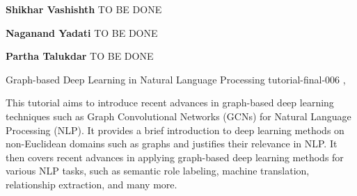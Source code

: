 \begin{bio}

\textbf{Shikhar Vashishth} TO BE DONE

\textbf{Naganand Yadati} TO BE DONE

\textbf{Partha Talukdar} TO BE DONE

\end{bio}

\begin{tutorial}
  {Graph-based Deep Learning in Natural Language Processing}
  {tutorial-final-006}
  {\daydateyear, \tutorialafternoontime}
  {\TutLocF}

This tutorial aims to introduce recent advances in graph-based deep learning techniques such as Graph Convolutional Networks (GCNs) for Natural Language Processing (NLP). It provides a brief introduction to deep learning methods on non-Euclidean domains such as graphs and justifies their relevance in NLP. It then covers recent advances in applying graph-based deep learning methods for various NLP tasks, such as semantic role labeling, machine translation, relationship extraction, and many more.

\end{tutorial}
